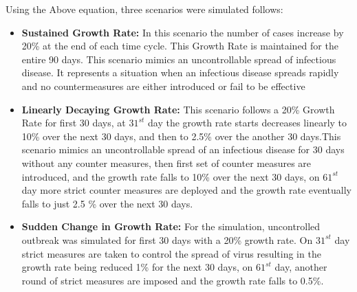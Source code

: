 \documentclass[12pt, twosided]{report}  %
\begin{document}
Using the Above equation, three scenarios were simulated follows:
\begin{itemize}
	\item \textbf{Sustained Growth Rate:} In this scenario the number of cases increase by 20\% at the end of each time cycle. This Growth Rate is maintained for the entire 90 days. This scenario mimics an uncontrollable spread of infectious disease. It represents a situation when an infectious disease spreads rapidly and no countermeasures are either introduced or fail to be effective
	\item \textbf{Linearly Decaying Growth Rate:} This scenario follows a 20\% Growth Rate for first 30 days, at $31^{st}$ day the growth rate starts decreases linearly to 10\% over the next 30 days, and then to 2.5\% over the another 30 days.This scenario mimics an uncontrollable spread of an infectious disease for 30 days without any counter measures, then first set of counter measures are introduced, and the growth rate falls to 10\% over the next 30 days, on $61^{st}$ day more strict counter measures are deployed and the growth rate eventually falls to just 2.5
	\% over the next 30 days.   
	\item \textbf{Sudden Change in Growth Rate:} For the simulation, uncontrolled outbreak was simulated for first 30 days with a 20\% growth rate. On $31^{st}$ day strict measures are taken to control the spread of virus resulting in the growth rate being reduced 1\% for the next 30 days, on $61^{st}$ day, another round of strict measures are imposed and the growth rate falls to  0.5\%. 
\end{itemize}
\end{document}
